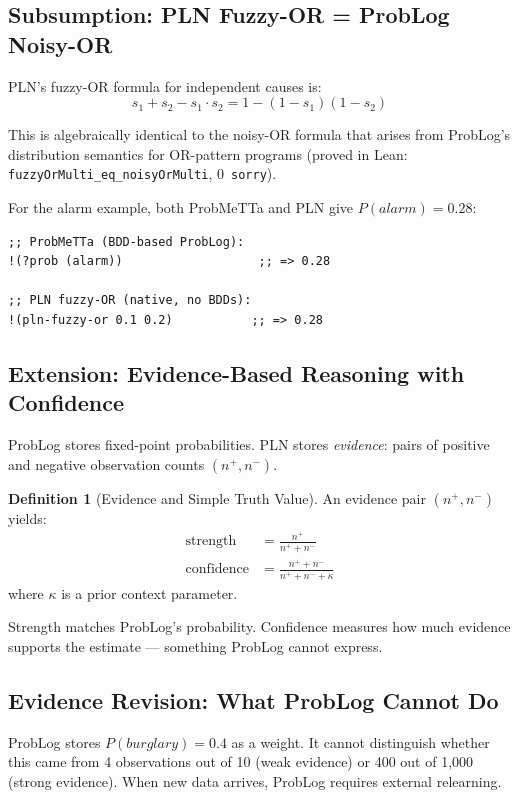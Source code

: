 \documentclass[11pt,a4paper]{article}
\theoremstyle{definition}
\newtheorem{definition}{Definition}[section]
\begin{document}
\subsection{Subsumption: PLN Fuzzy-OR = ProbLog Noisy-OR}

PLN's fuzzy-OR formula for independent causes is:
\[
s_1 + s_2 - s_1 \cdot s_2 = 1 - (1-s_1)(1-s_2)
\]

This is algebraically identical to the noisy-OR formula that arises from
ProbLog's distribution semantics for OR-pattern programs (proved in Lean:
\texttt{fuzzyOrMulti\_eq\_noisyOrMulti}, 0~\texttt{sorry}).

For the alarm example, both ProbMeTTa and PLN give $P(\mathit{alarm}) = 0.28$:

\begin{lstlisting}[language=MeTTa]
;; ProbMeTTa (BDD-based ProbLog):
!(?prob (alarm))                   ;; => 0.28

;; PLN fuzzy-OR (native, no BDDs):
!(pln-fuzzy-or 0.1 0.2)           ;; => 0.28
\end{lstlisting}

\subsection{Extension: Evidence-Based Reasoning with Confidence}

ProbLog stores fixed-point probabilities. PLN stores \emph{evidence}:
pairs of positive and negative observation counts $(n^+, n^-)$.

\begin{definition}[Evidence and Simple Truth Value]
An evidence pair $(n^+, n^-)$ yields:
\begin{align}
\mathrm{strength} &= \frac{n^+}{n^+ + n^-} \\
\mathrm{confidence} &= \frac{n^+ + n^-}{n^+ + n^- + \kappa}
\end{align}
where $\kappa$ is a prior context parameter.
\end{definition}

Strength matches ProbLog's probability. Confidence measures how much
evidence supports the estimate --- something ProbLog cannot express.

\subsection{Evidence Revision: What ProbLog Cannot Do}

ProbLog stores $P(\mathit{burglary}) = 0.4$ as a weight.
It cannot distinguish whether this came from 4 observations out of 10
(weak evidence) or 400 out of 1{,}000 (strong evidence).
When new data arrives, ProbLog requires external relearning.
\end{document}
